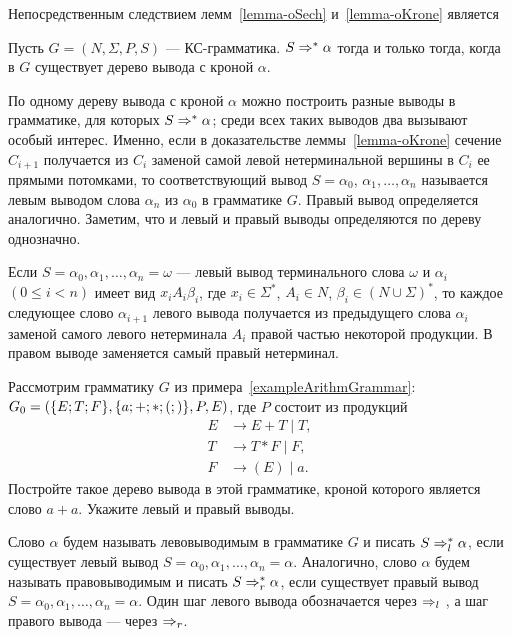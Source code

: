 Непосредственным следствием лемм~\ref{lemma-oSech} и~\ref{lemma-oKrone} является

\begin{mytheorem}
\label{theorem-SechKrona}
Пусть $G=(N,\Sigma,P,S)$ --- КС-грамматика. $S\Rightarrow^*\alpha$ тогда и только тогда, когда в $G$ существует дерево вывода с кроной $\alpha$.
\end{mytheorem}

По одному дереву вывода с кроной $\alpha$ можно построить разные выводы в грамматике, для которых $S\Rightarrow^*\alpha$; среди всех таких выводов два вызывают особый интерес. Именно, если в доказательстве леммы~\ref{lemma-oKrone} сечение $C_{i+1}$ получается из $C_i$ заменой самой левой нетерминальной вершины в $C_i$ ее прямыми потомками, то соответствующий вывод $S=\alpha_0$, $\alpha_1, \ldots , \alpha_n$ называется левым выводом слова $\alpha_n$ из $\alpha_0$ в грамматике $G$. Правый вывод определяется аналогично. Заметим, что и левый и правый выводы определяются по дереву однозначно.

Если $S=\alpha_0,\alpha_1, \ldots , \alpha_n=\omega$ --- левый вывод терминального слова $\omega$ и $\alpha_i$ $(0\le i<n)$ имеет вид $x_iA_i\beta_i$, где $x_i\in\Sigma^*$, $A_i\in N$, $\beta_i\in(N\cup\Sigma)^*$, то каждое следующее слово $\alpha_{i+1}$ левого вывода получается из предыдущего слова $\alpha_i$ заменой самого левого нетерминала $A_i$ правой частью некоторой продукции. В правом выводе заменяется самый правый нетерминал.

\begin{myproblem}
Рассмотрим грамматику $G$ из примера~\ref{exampleArithmGrammar}: $G_0=(\{E;T;F\},\\\{a;+;*;(;)\},P,E)$, где $P$ состоит из продукций
\begin{align*}
    E &\to E+T \mid T, \\
    T &\to T*F \mid F, \\
    F &\to (E) \mid a.
\end{align*}
Постройте такое дерево вывода в этой грамматике, кроной которого является слово $a+a$. Укажите левый и правый выводы.
\end{myproblem}

Слово $\alpha$ будем называть левовыводимым в грамматике $G$ и писать $S\Rightarrow_l^*\alpha$, если существует левый вывод $S=\alpha_0,\alpha_1, \ldots , \alpha_n=\alpha$. Аналогично, слово $\alpha$ будем называть правовыводимым и писать $S\Rightarrow_r^*\alpha$, если существует правый вывод $S=\alpha_0,\alpha_1, \ldots , \alpha_n=\alpha$. Один шаг левого вывода обозначается через $\Rightarrow_l$ , а шаг правого вывода --- через $\Rightarrow_r$.

